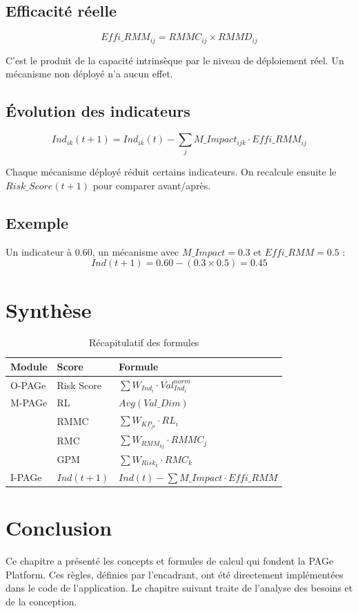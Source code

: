 \subsection{Efficacité réelle}
$$
Effi\_RMM_{ij} = RMMC_{ij} \times RMMD_{ij}
$$

C'est le produit de la capacité intrinsèque par le niveau de déploiement réel. Un mécanisme non déployé n'a aucun effet.

\subsection{Évolution des indicateurs}
$$
Ind_{ik}(t+1) = Ind_{ik}(t) - \sum_{j} M\_Impact_{ijk} \cdot Effi\_RMM_{ij}
$$

Chaque mécanisme déployé réduit certains indicateurs. On recalcule ensuite le $Risk\_Score(t+1)$ pour comparer avant/après.

\subsection{Exemple}
Un indicateur à 0.60, un mécanisme avec $M\_Impact = 0.3$ et $Effi\_RMM = 0.5$ :
$$
Ind(t+1) = 0.60 - (0.3 \times 0.5) = 0.45
$$

\section{Synthèse}

\begin{table}[h!]
\centering
\renewcommand{\arraystretch}{1.4}
\begin{tabular}{@{}p{}p{}p{}@{}}
\hline
\textbf{Module} & \textbf{Score} & \textbf{Formule} \\
\hline
O-PAGe & Risk Score & $\sum W_{Ind_i} \cdot Val^{norm}_{Ind_i}$ \\
\hline
M-PAGe & RL & $Avg(Val\_Dim)$ \\
 & RMMC & $\sum W_{KP_{ji}} \cdot RL_i$ \\
 & RMC & $\sum W_{RMM_{kj}} \cdot RMMC_j$ \\
 & GPM & $\sum W_{Risk_k} \cdot RMC_k$ \\
\hline
I-PAGe & $Ind(t+1)$ & $Ind(t) - \sum M\_Impact \cdot Effi\_RMM$ \\
\hline
\end{tabular}
\caption{Récapitulatif des formules}
\end{table}

\section{Conclusion}
Ce chapitre a présenté les concepts et formules de calcul qui fondent la PAGe Platform. Ces règles, définies par l'encadrant, ont été directement implémentées dans le code de l'application. Le chapitre suivant traite de l'analyse des besoins et de la conception.
